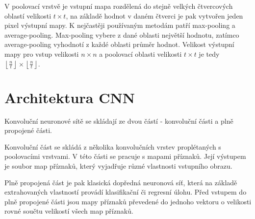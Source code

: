 V poolovací vrstvě je vstupní mapa rozdělená do stejně velkých čtvercových
oblastí velikosti $t \times t$, na základě hodnot v daném čtverci je pak
vytvořen jeden pixel výstupní mapy. K nejčastěji používaným metodám patří
max-pooling a average-pooling. Max-pooling vybere z dané oblasti největší
hodnotu, zatímco average-pooling vyhodnotí z každé oblasti průměr hodnot.
Velikost výstupní mapy pro vstup velikosti $n \times n$ a poolovací oblasti
velikosti $t \times t$ je tedy $\left\lfloor \frac{n}{t} \right\rfloor \times
    \left\lfloor \frac{n}{t} \right\rfloor$.

\section{Architektura CNN}

Konvoluční neuronové sítě se skládají ze dvou částí - konvoluční části a plně
propojené části.

Konvoluční část se skládá z několika konvolučních vrstev proplétaných s
poolovacími vrstvami. V této části se pracuje s mapami příznaků. Její výstupem
je soubor map příznaků, který vyjadřuje různé vlastnosti vstupního obrazu.

Plně propojená část je pak klasická dopředná neuronová síť, která na základě
extrahovaných vlastností provádí klasifikační či regresní úlohu. Před vstupem
do plně propojené části jsou mapy příznaků převedené do jednoho vektoru o
velikosti rovné součtu velikostí všech map příznaků.

\endinput
